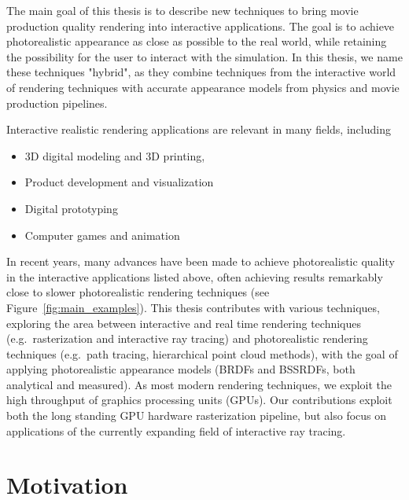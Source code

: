 The main goal of this thesis is to describe new techniques to bring movie production quality rendering into interactive applications.  The goal is to achieve photorealistic appearance as close as possible to the real world, while retaining the possibility for the user to interact with the simulation. In this thesis, we name these techniques "hybrid", as they combine techniques from the interactive world of rendering techniques with accurate appearance models from physics and movie production pipelines.

Interactive realistic rendering applications are relevant in many fields, including
\begin{itemize}
\item 3D digital modeling and 3D printing,
\item Product development and visualization
\item Digital prototyping
\item Computer games and animation
\end{itemize}
In recent years, many advances have been made to achieve photorealistic quality in the interactive applications listed above, often achieving results remarkably close to slower photorealistic rendering techniques (see Figure~\ref{fig:main_examples}). This thesis contributes with various techniques, exploring the area between interactive and real time rendering techniques (e.g.\ rasterization and interactive ray tracing) and photorealistic rendering techniques (e.g.\ path tracing, hierarchical point cloud methods), with the goal of applying photorealistic appearance models (BRDFs and BSSRDFs, both analytical and measured). As most modern rendering techniques, we exploit the high throughput of graphics processing units (GPUs). Our contributions exploit both the long standing GPU hardware rasterization pipeline, but also focus on applications of the currently expanding field of interactive ray tracing. 

\section{Motivation}

